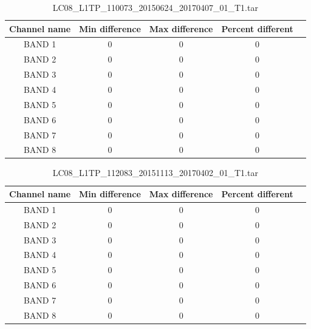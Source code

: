 \documentclass[a4paper]{article}
\begin{document}
    \begin{table}[ht!]
      \caption{LC08\_L1TP\_110073\_20150624\_20170407\_01\_T1.tar}\label{table:14}
      \centering
      \small
      \begin{tabular}{ccccc} \midrule
        \textbf{Channel name} & \textbf{Min difference} & \textbf{Max difference} & \textbf{Percent different} \\ \midrule
        BAND 1 & 0 & 0 & 0 \\
        BAND 2 & 0 & 0 & 0 \\
        BAND 3 & 0 & 0 & 0 \\
        BAND 4 & 0 & 0 & 0 \\
        BAND 5 & 0 & 0 & 0 \\
        BAND 6 & 0 & 0 & 0 \\
        BAND 7 & 0 & 0 & 0 \\
        BAND 8 & 0 & 0 & 0 \\ \midrule
      \end{tabular}
    \end{table}

    \begin{table}[ht!]
      \caption{LC08\_L1TP\_112083\_20151113\_20170402\_01\_T1.tar}\label{table:15}
      \centering
      \small
      \begin{tabular}{ccccc} \midrule
        \textbf{Channel name} & \textbf{Min difference} & \textbf{Max difference} & \textbf{Percent different} \\ \midrule
        BAND 1 & 0 & 0 & 0 \\
        BAND 2 & 0 & 0 & 0 \\
        BAND 3 & 0 & 0 & 0 \\
        BAND 4 & 0 & 0 & 0 \\
        BAND 5 & 0 & 0 & 0 \\
        BAND 6 & 0 & 0 & 0 \\
        BAND 7 & 0 & 0 & 0 \\
        BAND 8 & 0 & 0 & 0 \\ \midrule
      \end{tabular}
    \end{table}
\end{document}

